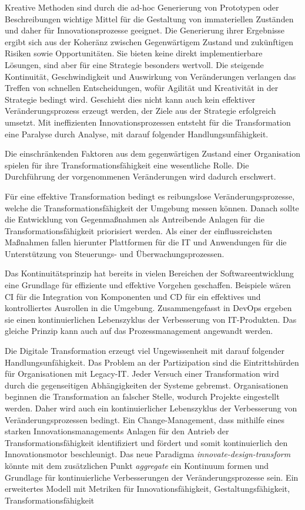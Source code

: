 Kreative Methoden sind durch die ad-hoc Generierung von Prototypen oder Beschreibungen wichtige Mittel für die Gestaltung von immateriellen Zuständen und daher für Innovationsprozesse geeignet. Die Generierung ihrer Ergebnisse ergibt sich aus der Koheränz zwischen Gegenwärtigem Zustand und zukünftigen Risiken sowie Opportunitäten. Sie bieten keine direkt implementierbare Lösungen, sind aber für eine Strategie besonders wertvoll. Die steigende Kontinuität, Geschwindigkeit und Auswirkung von Veränderungen verlangen das Treffen von schnellen Entscheidungen, wofür Agilität und Kreativität in der Strategie bedingt wird. Geschieht dies nicht kann auch kein effektiver Veränderungsprozess erzeugt werden, der Ziele aus der Strategie erfolgreich umsetzt. Mit ineffizienten Innovationsprozessen entsteht für die Transformation eine Paralyse durch Analyse, mit darauf folgender Handlungsunfähigkeit. 

Die einschränkenden Faktoren aus dem gegenwärtigen Zustand einer Organisation spielen für ihre Transformationsfähigkeit eine wesentliche Rolle. Die Durchführung der vorgenommenen Veränderungen wird dadurch erschwert. 

Für eine effektive Transformation bedingt es reibungslose Veränderungsprozesse, welche die Transformationsfähigkeit der Umgebung messen können. Danach sollte die Entwicklung von Gegenmaßnahmen als Antreibende Anlagen für die Transformationsfähigkeit priorisiert werden. Als einer der einflussreichsten Maßnahmen fallen hierunter Plattformen für die IT und Anwendungen für die Unterstützung von Steuerungs- und Überwachungsprozessen.

Das Kontinuitätsprinzip hat bereits in vielen Bereichen der Softwareentwicklung eine Grundlage für effiziente und effektive Vorgehen geschaffen. Beispiele wären \ac{CI} für die Integration von Komponenten und \ac{CD} für ein effektives und kontrolliertes Ausrollen in die Umgebung. Zusammengefasst in DevOps ergeben sie einen kontinuierlichen Lebenszyklus der Verbesserung von IT-Produkten. Das gleiche Prinzip kann auch auf das Prozessmanagement angewandt werden.

Die Digitale Transformation erzeugt viel Ungewissenheit mit darauf folgender Handlungsunfähigkeit. Das Problem an der Partizipation sind die Eintrittshürden für Organisationen mit Legacy-IT. Jeder Versuch einer Transformation wird durch die gegenseitigen Abhängigkeiten der Systeme gebremst. Organisationen beginnen die Transformation an falscher Stelle, wodurch Projekte eingestellt werden. Daher wird auch ein kontinuierlicher Lebenszyklus der Verbesserung von Veränderungsprozessen bedingt. Ein Change-Management, dass mithilfe eines starken Innovationsmanagements Anlagen für den Antrieb der Transformationsfähigkeit identifiziert und fördert und somit kontinuierlich den Innovationsmotor beschleunigt.
Das neue Paradigma \emph{innovate-design-transform} könnte mit dem zusätzlichen Punkt \emph{aggregate} ein Kontinuum formen und Grundlage für kontinuierliche Verbesserungen der Veränderungsprozesse sein. Ein erweitertes Modell mit Metriken für Innovationsfähigkeit, Gestaltungsfähigkeit, Transformationsfähigkeit